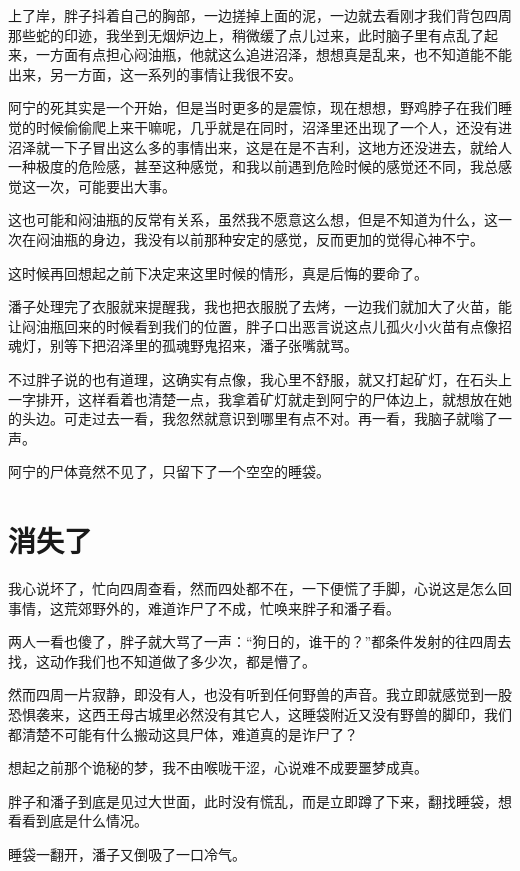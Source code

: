 上了岸，胖子抖着自己的胸部，一边搓掉上面的泥，一边就去看刚才我们背包四周那些蛇的印迹，我坐到无烟炉边上，稍微缓了点儿过来，此时脑子里有点乱了起来，一方面有点担心闷油瓶，他就这么追进沼泽，想想真是乱来，也不知道能不能出来，另一方面，这一系列的事情让我很不安。

阿宁的死其实是一个开始，但是当时更多的是震惊，现在想想，野鸡脖子在我们睡觉的时候偷偷爬上来干嘛呢，几乎就是在同时，沼泽里还出现了一个人，还没有进沼泽就一下子冒出这么多的事情出来，这是在是不吉利，这地方还没进去，就给人一种极度的危险感，甚至这种感觉，和我以前遇到危险时候的感觉还不同，我总感觉这一次，可能要出大事。

这也可能和闷油瓶的反常有关系，虽然我不愿意这么想，但是不知道为什么，这一次在闷油瓶的身边，我没有以前那种安定的感觉，反而更加的觉得心神不宁。

这时候再回想起之前下决定来这里时候的情形，真是后悔的要命了。

潘子处理完了衣服就来提醒我，我也把衣服脱了去烤，一边我们就加大了火苗，能让闷油瓶回来的时候看到我们的位置，胖子口出恶言说这点儿孤火小火苗有点像招魂灯，别等下把沼泽里的孤魂野鬼招来，潘子张嘴就骂。

不过胖子说的也有道理，这确实有点像，我心里不舒服，就又打起矿灯，在石头上一字排开，这样看着也清楚一点，我拿着矿灯就走到阿宁的尸体边上，就想放在她的头边。可走过去一看，我忽然就意识到哪里有点不对。再一看，我脑子就嗡了一声。

阿宁的尸体竟然不见了，只留下了一个空空的睡袋。

\chapter{消失了}

我心说坏了，忙向四周查看，然而四处都不在，一下便慌了手脚，心说这是怎么回事情，这荒郊野外的，难道诈尸了不成，忙唤来胖子和潘子看。

两人一看也傻了，胖子就大骂了一声：“狗日的，谁干的？”都条件发射的往四周去找，这动作我们也不知道做了多少次，都是懵了。

然而四周一片寂静，即没有人，也没有听到任何野兽的声音。我立即就感觉到一股恐惧袭来，这西王母古城里必然没有其它人，这睡袋附近又没有野兽的脚印，我们都清楚不可能有什么搬动这具尸体，难道真的是诈尸了？

想起之前那个诡秘的梦，我不由喉咙干涩，心说难不成要噩梦成真。

胖子和潘子到底是见过大世面，此时没有慌乱，而是立即蹲了下来，翻找睡袋，想看看到底是什么情况。

睡袋一翻开，潘子又倒吸了一口冷气。


